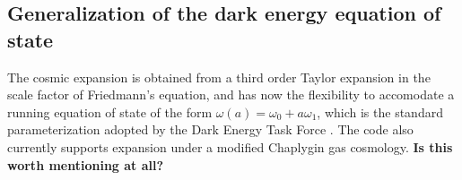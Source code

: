 \subsection{Generalization of the dark energy equation of state}
\label{subsec:runningomegal}

The cosmic expansion is obtained from a third order Taylor expansion in the scale factor of Friedmann's equation,
and has now the flexibility to accomodate a running equation of state of the form $\omega(a) = \omega_0 + a\omega_1$,
which is the standard parameterization adopted by the Dark Energy Task Force \citep{2006astro.ph..9591A}.
The code also currently supports expansion under a modified Chaplygin gas cosmology\cite{Chaplygin}. 
{\bf Is this worth mentioning at all?}

